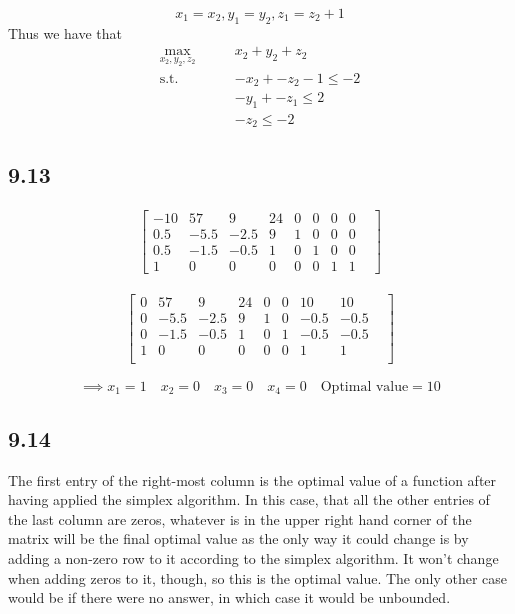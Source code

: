 \documentclass[letterpaper,12pt]{article}
\theoremstyle{definition}
\begin{document}
\[x_1 = x_2, y_1 = y_2, z_1 = z_2+1\] Thus we have that \\
\begin{align*}
\displaystyle \max_{x_2, y_2, z_2} \qquad &x_2  +y_2 +z_2\\ 
\text{s.t.} \qquad &-x_2+-z_2-1 \leq -2\\
&-y_1+-z_1 \leq 2\\
&-z_2 \leq -2
\end{align*}

\subsection*{9.13}
\begin{align*}
\begin{bmatrix}
-10&  57&   9&  24&   0&   0&   0&   0&\\
  0.5&  -5.5  &-2.5 &  9&   1&   0&   0&   0&\\
  0.5&  -1.5 & -0.5  & 1&   0&   1&   0&   0&\\
  1&   0&   0&   0&   0&   0&   1&   1&
\end{bmatrix}
\end{align*}

\begin{align*}
\begin{bmatrix}
  0&  57&   9&  24&   0&   0&  10&  10&\\
  0&  -5.5&  -2.5   &9&   1&   0&  -0.5  &-0.5\\
  0&  -1.5 & -0.5 &  1&   0&   1&  -0.5&  -0.5\\
  1&   0&   0&   0&   0&   0&   1&   1&\\
\end{bmatrix}
\end{align*}
 
\[ \implies x_1 = 1 \quad  x_2 = 0 \quad x_3 = 0 \quad x_4 = 0  \quad \text{Optimal value} = 10\]

\subsection*{9.14}

The first entry of the right-most column is the optimal value of a function after having applied the simplex algorithm. In this case, that all the other entries of the last column are zeros, whatever is in the upper right hand corner of the matrix will be the final optimal value as the only way it could change is by adding a non-zero row to it according to the simplex algorithm. It won't change when adding zeros to it, though, so this is the optimal value. The only other case would be if there were no answer, in which case it would be unbounded.
\end{document}
